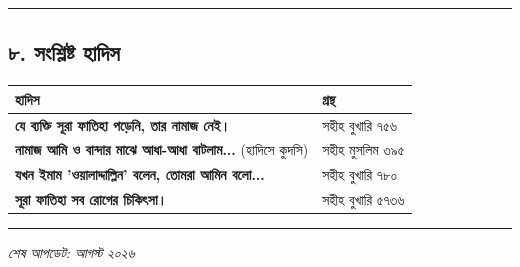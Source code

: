 \medskip\hrule\medskip

\subsection*{৮. সংশ্লিষ্ট হাদিস}

\begin{table}[h]\centering\small
\begin{tabular}{ll}
হাদিস & গ্রন্থ \\
\hline
\textbf{\lat{“}যে ব্যক্তি সূরা ফাতিহা পড়েনি, তার নামাজ নেই।\lat{”}} & সহীহ বুখারি ৭৫৬ \\
\textbf{\lat{“}নামাজ আমি ও বান্দার মাঝে আধা-আধা বাটলাম...\lat{”}} (হাদিসে কুদসি) & সহীহ মুসলিম ৩৯৫ \\
\textbf{\lat{“}যখন ইমাম 'ওয়ালাদ্দাল্লিন' বলেন, তোমরা আমিন বলো...\lat{”}} & সহীহ বুখারি ৭৮০ \\
\textbf{\lat{“}সূরা ফাতিহা সব রোগের চিকিৎসা।\lat{”}} & সহীহ বুখারি ৫৭৩৬ \\
\hline
\end{tabular}
\end{table}

\medskip\hrule\medskip

\textit{শেষ আপডেট: আগস্ট ২০২৬}



